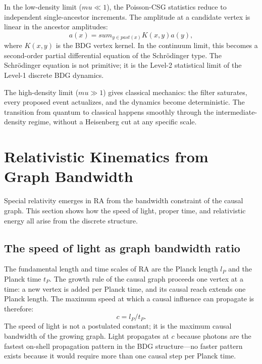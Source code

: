 \documentclass[11pt]{article}
\def\ell{l}%
\def\mu{mu}%
\def\mathrm#1{#1}%
\def\frac#1#2{#1/#2}%
\def\sum{sum}%
\begin{document}
In the low-density limit ($\mu \ll 1$), the Poisson-CSG statistics reduce to independent single-ancestor increments. The amplitude at a candidate vertex is linear in the ancestor amplitudes:
\begin{equation}
a(x) = \sum_{y \in \mathrm{past}(x)} K(x, y) a(y),
\end{equation}
where $K(x, y)$ is the BDG vertex kernel. In the continuum limit, this becomes a second-order partial differential equation of the Schr\"odinger type. The Schr\"odinger equation is not primitive; it is the Level-2 statistical limit of the Level-1 discrete BDG dynamics.

The high-density limit ($\mu \gg 1$) gives classical mechanics: the filter saturates, every proposed event actualizes, and the dynamics become deterministic. The transition from quantum to classical happens smoothly through the intermediate-density regime, without a Heisenberg cut at any specific scale.

\section{Relativistic Kinematics from Graph Bandwidth}
\label{sec:relativistic}

Special relativity emerges in RA from the bandwidth constraint of the causal graph. This section shows how the speed of light, proper time, and relativistic energy all arise from the discrete structure.

\subsection{The speed of light as graph bandwidth ratio}

The fundamental length and time scales of RA are the Planck length $\ell_P$ and the Planck time $t_P$. The growth rule of the causal graph proceeds one vertex at a time: a new vertex is added per Planck time, and its causal reach extends one Planck length. The maximum speed at which a causal influence can propagate is therefore:
\begin{equation}
\label{eq:c_bandwidth}
\boxed{c = \frac{\ell_P}{t_P}.}
\end{equation}
The speed of light is not a postulated constant; it is the maximum causal bandwidth of the growing graph. Light propagates at $c$ because photons are the fastest on-shell propagation pattern in the BDG structure---no faster pattern exists because it would require more than one causal step per Planck time.
\end{document}
